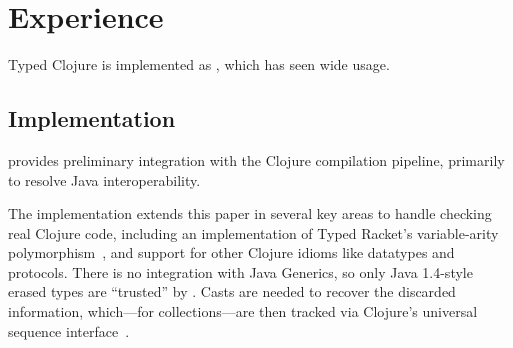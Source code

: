 \section{Experience}
\label{sec:experience}

Typed Clojure is implemented as \coretyped{}, which has seen wide usage.

\subsection{Implementation}

\coretyped{} provides preliminary integration with the Clojure compilation
pipeline, primarily to resolve Java interoperability.


The \coretyped{} implementation extends this paper in several key areas 
to handle checking real Clojure code, including an implementation
of Typed Racket's variable-arity polymorphism~\cite{stf-esop}, 
and support for other Clojure idioms like datatypes and protocols.
%
There is no integration with Java Generics, so only Java 1.4-style erased types are ``trusted''
by \coretyped{}.
Casts are needed to recover the discarded information, which---for collections---are 
then tracked via Clojure's universal sequence interface~\cite{CljSeqDoc}.



